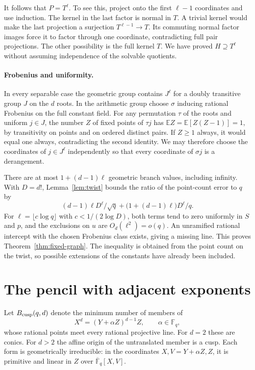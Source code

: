 \documentclass[preprint,12pt,numbers]{elsarticle}
\begin{document}
It follows that $P=T^\ell$. To see this, project onto the first
$\ell-1$ coordinates and use induction. The kernel in the last factor
is normal in $T$. A trivial kernel would make the last projection
a surjection $T^{\ell-1}\to T$. Its commuting normal factor images
force it to factor through one coordinate, contradicting full pair
projections. The other possibility is the full kernel $T$. We have
proved $H\supseteq T^\ell$ without assuming independence of the
solvable quotients.

\paragraph{Frobenius and uniformity.}
In every separable case the geometric group contains $J^\ell$ for a
doubly transitive group $J$ on the $d$ roots. In the arithmetic group
choose $\sigma$ inducing rational Frobenius on the full constant field.
For any permutation $\tau$ of the roots and uniform $j\in J$, the
number $Z$ of fixed points of $\tau j$ has
$\mathbb E Z=\mathbb E[Z(Z-1)]=1$, by transitivity on points and on
ordered distinct pairs. If $Z\ge1$ always, it would equal one always,
contradicting the second identity. We may therefore choose the
coordinates of $j\in J^\ell$ independently so that every coordinate of
$\sigma j$ is a derangement.

There are at most $1+(d-1)\ell$ geometric branch values, including
infinity. With $D=d!$, Lemma~\ref{lem:twist} bounds the ratio of the
point-count error to $q$ by
\[
    (d-1)\ell D^\ell/\sqrt q+
    \big(1+(d-1)\ell\big)D^\ell/q .
\]
For $\ell=\lfloor c\log q\rfloor$ with $c<1/(2\log D)$, both terms
tend to zero uniformly in $S$ and $p$, and the exclusions on $u$ are
$O_d(\ell^2)=o(q)$. An unramified rational intercept with the chosen
Frobenius class exists, giving a missing line. This proves
Theorem~\ref{thm:fixed-graph}. The inequality is obtained from the
point count on the twist, so possible extensions of the constants have
already been included.

\section{The pencil with adjacent exponents}\label{sec:cusp-general}

Let $B_{\rm cusp}(q,d)$ denote the minimum number of members of
\[
                 X^d=(Y+\alpha Z)^{d-1}Z,\qquad \alpha\in\mathbb F_q,
\]
whose rational points meet every rational projective line. For $d=2$
these are conics. For $d>2$ the affine origin of the untranslated
member is a cusp. Each form is geometrically irreducible: in the
coordinates $X,V=Y+\alpha Z,Z$, it is primitive and linear in $Z$
over $\overline{\mathbb F}_q[X,V]$.
\end{document}
